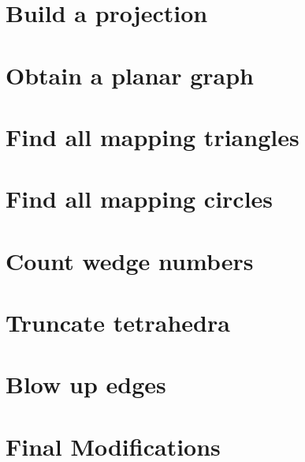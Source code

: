 \label{cha:alg1}



\section{Build a projection}


\section{Obtain a planar graph}


%

%

\section{Find all mapping triangles}


\section{Find all mapping circles}


\section{Count wedge numbers}


\section{Truncate tetrahedra}


\section{Blow up edges}


\section{Final Modifications}

